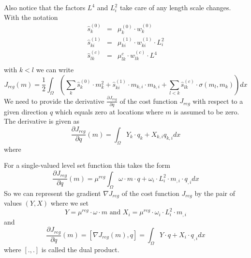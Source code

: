 Also notice that the factors $L^4$ and $L_i^2$ take care of any length scale changes.
With the notation
\begin{equation}\label{EQU:REG:2}
\begin{array}{rcl}
\widehat{s}^{(0)}_k & = & \mu^{(0)}_k \cdot w^{(0)}_k \\
\widehat{s}^{(1)}_{ki} & = & \mu^{(1)}_{ki} \cdot w^{(1)}_{ki} \cdot L_i^2  \\
\widehat{s}^{(c)}_{lk} & = & \mu^{c}_{lk} \cdot w^{(c)}_{lk} \cdot L^4  \\
\end{array}
\end{equation} 
with $k<l$ we can write
\begin{equation}\label{EQU:REG:1b}
J_{reg}(m) = \frac{1}{2} \int_{\Omega} \left(
 \sum_{k} \widehat{s}^{(0)}_k \cdot m_k^2 + \widehat{s}^{(1)}_{ki}  \cdot m_{k,i} \cdot m_{k,i}
+  \sum_{l<k} \widehat{s}^{(c)}_{lk} \cdot  \sigma(m_l,m_k) \right) dx 
\end{equation} 
We need to provide the derivative $\frac{ \partial J_{reg}}{\partial q}$  of
the cost function $J_{reg}$ with respect to a given direction $q$ which equals
zero at locations where $m$ is assumed to be zero.
The derivative is given as 
\begin{equation}\label{EQU:REG:3}
\frac{ \partial J_{reg}}{\partial q}(m) =
 \int_{\Omega} Y_k \cdot q_k + X_{k,i} q_{k,i} dx 
\end{equation} 
where



For a single-valued level set function this takes the form 
\begin{equation}\label{EQU:REG:3}
\frac{ \partial J_{reg}}{\partial q}(m) =
\mu^{reg} \int_{\Omega} \omega \cdot m \cdot q  + \omega_i \cdot L_i^2 \cdot m_{,i} \cdot q_{,i} dx
\end{equation} 
So we can represent the gradient $\nabla J_{reg}$ of the cost function
$J_{reg}$ by the pair of values $(Y,X)$ where we set   
\begin{equation}\label{EQU:REG:3b}
Y=\mu^{reg} \cdot \omega \cdot m \mbox{ and } X_i = \mu^{reg} \cdot \omega_i \cdot L_i^2 \cdot m_{,i}
\end{equation} 
and 
\begin{equation}\label{EQU:REG:3c}
\frac{ \partial J_{reg}}{\partial q}(m) = [ \nabla J_{reg}(m), q ] =
\int_{\Omega} Y  \cdot q  + X_i  \cdot q_{,i} dx
\end{equation} 
where $[.,.]$ is called the dual product.



